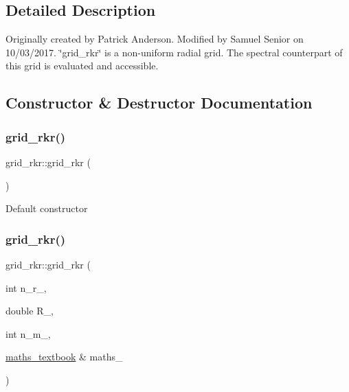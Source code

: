 \subsection{Detailed Description}
Originally created by Patrick Anderson. Modified by Samuel Senior on 10/03/2017. \char`\"{}grid\+\_\+rkr\char`\"{} is a non-\/uniform radial grid. The spectral counterpart of this grid is evaluated and accessible. 

\subsection{Constructor \& Destructor Documentation}
\mbox{\label{classgrid__rkr_a8c3f61553704783780b89fb19aeb400c}} 
\subsubsection{\texorpdfstring{grid\+\_\+rkr()}{grid\_rkr()}\hspace{0.1cm}{\footnotesize\ttfamily [1/2]}}
{\footnotesize\ttfamily grid\+\_\+rkr\+::grid\+\_\+rkr (\begin{DoxyParamCaption}{ }\end{DoxyParamCaption})}

Default constructor \mbox{\label{classgrid__rkr_adc3dbfbeb1dcc1ac948b58d26a83ffd1}} 
\subsubsection{\texorpdfstring{grid\+\_\+rkr()}{grid\_rkr()}\hspace{0.1cm}{\footnotesize\ttfamily [2/2]}}
{\footnotesize\ttfamily grid\+\_\+rkr\+::grid\+\_\+rkr (\begin{DoxyParamCaption}\item[{int}]{n\+\_\+r\+\_\+,  }\item[{double}]{R\+\_\+,  }\item[{int}]{n\+\_\+m\+\_\+,  }\item[{\hyperlink{classmaths__textbook}{maths\+\_\+textbook} \&}]{maths\+\_\+ }\end{DoxyParamCaption})}

